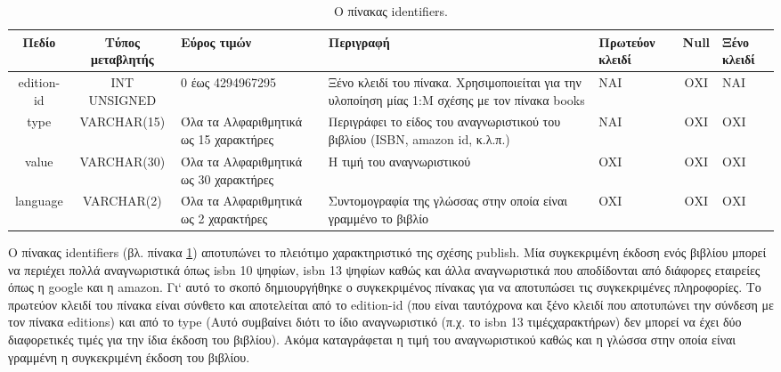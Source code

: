 \documentclass{assignment}
\begin{document}
\begin{landscape}
\begin{table}[htbp]
\begin{center}
  \begin{tabular}{|c|c|m{}|m{}|m{2.0cm}|c|m{1.5cm}|}
    \hline
    {\bf Πεδίο} & {\bf Τύπος μεταβλητής} & {\bf Εύρος τιμών} & {\bf Περιγραφή} & {\bf Πρωτεύον κλειδί} & {\bf Null} & {\bf Ξένο κλειδί} \\ \hline
    edition-id & INT UNSIGNED & 0 έως 4294967295 & Ξένο κλειδί του πίνακα. Χρησιμοποιείται για την υλοποίηση μίας 1:Μ σχέσης με τον πίνακα books & ΝΑΙ & ΟΧΙ & NAI \\ \hline
    type & VARCHAR(15) & Όλα τα Αλφαριθμητικά ως 15 χαρακτήρες & Περιγράφει το είδος του αναγνωριστικού του βιβλίου (ISBN, amazon id, κ.λ.π.)  & ΝΑΙ & ΟΧΙ & ΟΧΙ \\ \hline
    value & VARCHAR(30) & Όλα τα Αλφαριθμητικά ως 30 χαρακτήρες & Η τιμή του αναγνωριστικού  & OXI & ΟΧΙ & ΟΧΙ \\ \hline
    language & VARCHAR(2) & Όλα τα Αλφαριθμητικά ως 2 χαρακτήρες & Συντομογραφία της γλώσσας στην οποία είναι γραμμένο το βιβλίο  & OXI & ΟΧΙ & ΟΧΙ \\ \hline
  \end{tabular}
\caption{Ο πίνακας identifiers.}
\label{table:db_table:identifiers}
\end{center}
\end{table}

Ο πίνακας identifiers (βλ. πίνακα \ref{table:db_table:identifiers}) αποτυπώνει το πλειότιμο χαρακτηριστικό της σχέσης publish. Μία συγκεκριμένη έκδοση ενός βιβλίου μπορεί να περιέχει πολλά αναγνωριστικά όπως isbn 10 ψηφίων, isbn 13 ψηφίων καθώς και άλλα αναγνωριστικά που αποδίδονται από διάφορες εταιρείες όπως η google και η amazon. Γι` αυτό το σκοπό δημιουργήθηκε ο συγκεκριμένος πίνακας για να αποτυπώσει τις συγκεκριμένες πληροφορίες. Το πρωτεύον κλειδί του πίνακα είναι σύνθετο και αποτελείται από το edition-id (που είναι ταυτόχρονα και ξένο κλειδί που αποτυπώνει την σύνδεση με τον πίνακα editions) και από το type (Αυτό συμβαίνει διότι το ίδιο αναγνωριστικό (π.χ. το isbn 13 τιμέςχαρακτήρων) δεν μπορεί να έχει δύο διαφορετικές τιμές για την ίδια έκδοση του βιβλίου). Ακόμα καταγράφεται η τιμή του αναγνωριστικού καθώς και η γλώσσα στην οποία είναι γραμμένη η συγκεκριμένη έκδοση του βιβλίου.
\end{landscape}
\end{document}
